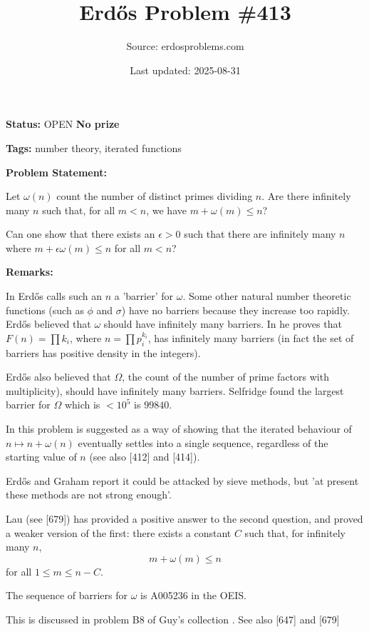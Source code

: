 \documentclass{article}
\title{Erd\H{o}s Problem \#413}
\date{Last updated: 2025-08-31}
\author{Source: erdosproblems.com}
\begin{document}
\maketitle

\noindent\textbf{Status:} OPEN \quad \textbf{No prize}

\noindent\textbf{Tags:} number theory, iterated functions

\medskip
\noindent\textbf{Problem Statement:}

Let $\omega(n)$ count the number of distinct primes dividing $n$. Are there infinitely many $n$ such that, for all $m<n$, we have $m+\omega(m) \leq n$?

Can one show that there exists an $\epsilon>0$ such that there are infinitely many $n$ where $m+\epsilon \omega(m)\leq n$ for all $m<n$?

\bigskip
\noindent\textbf{Remarks:}

In \cite{Er79} Erd\H{o}s calls such an $n$ a 'barrier' for $\omega$. Some other natural number theoretic functions (such as $\phi$ and $\sigma$) have no barriers because they increase too rapidly. Erd\H{o}s believed that $\omega$ should have infinitely many barriers. In \cite{Er79d} he proves that $F(n)=\prod k_i$, where $n=\prod p_i^{k_i}$, has infinitely many barriers (in fact the set of barriers has positive density in the integers).

Erd\H{o}s also believed that $\Omega$, the count of the number of prime factors with multiplicity), should have infinitely many barriers. Selfridge found the largest barrier for $\Omega$ which is $<10^5$ is $99840$.

In \cite{ErGr80} this problem is suggested as a way of showing that the iterated behaviour of $n\mapsto n+\omega(n)$ eventually settles into a single sequence, regardless of the starting value of $n$ (see also [412] and [414]). 

Erd\H{o}s and Graham report it could be attacked by sieve methods, but 'at present these methods are not strong enough'. 

Lau \cite{La26} (see [679]) has provided a positive answer to the second question, and proved a weaker version of the first: there exists a constant $C$ such that, for infinitely many $n$,\[m+\omega(m) \leq n\]for all $1\leq m\leq n-C$.

The sequence of barriers for $\omega$ is A005236 in the OEIS.

This is discussed in problem B8 of Guy's collection \cite{Gu04}. See also [647] and [679]
\end{document}
